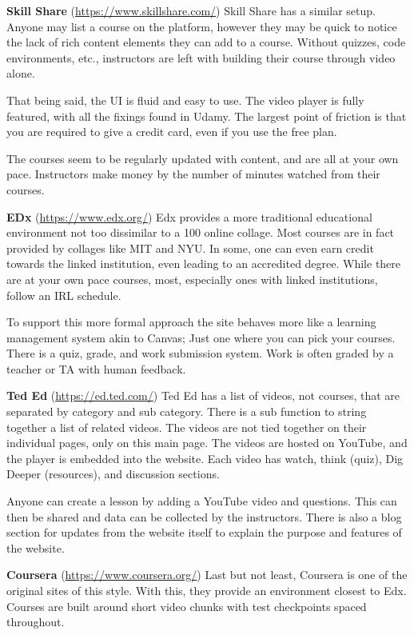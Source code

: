 \documentclass{article}
\begin{document}
\textbf{Skill Share} (\url{https://www.skillshare.com/})
Skill Share has a similar setup. Anyone may list a course on the platform,
however they may be quick to notice the lack of rich content elements they can
add to a course. Without quizzes, code environments, etc., instructors are
left with building their course through video alone.

That being said, the UI is fluid and easy to use. The video player is fully
featured, with all the fixings found in Udamy. The largest point of friction is
that you are required to give a credit card, even if you use the free
plan.

The courses seem to be regularly updated with content, and are all at your own
pace. Instructors make money by the number of minutes watched from their
courses.

\textbf{EDx} (\url{https://www.edx.org/})
Edx provides a more traditional educational environment not too dissimilar to a 100%
online collage. Most courses are in fact provided by collages like MIT and NYU.
In some, one can even earn credit towards the linked institution, even leading
to an accredited degree. While there are at your own pace courses,
most, especially ones with linked institutions, follow an IRL schedule.

To support this more formal approach the site behaves more like a learning
management system akin to Canvas; Just one where you can pick your courses.
There is a quiz, grade, and work submission system. Work is often graded by a
teacher or TA with human feedback.

\textbf{Ted Ed} (\url{https://ed.ted.com/})
Ted Ed has a list of videos, not courses, that are separated by category and sub category. There is a sub function to string together a list of related videos. The videos are not tied together on their individual pages, only on this main page. The videos are hosted on YouTube, and the player is embedded into the website. Each video has watch, think (quiz), Dig Deeper (resources), and discussion sections.

Anyone can create a lesson by adding a YouTube video and questions. This can then be shared and data can be collected by the instructors. There is also a blog section for updates from the website itself to explain the purpose and features of the website.

\textbf{Coursera} (\url{https://www.coursera.org/})
Last but not least, Coursera is one of the original sites of this style. With
this, they provide an environment closest to Edx. Courses are built around short
video chunks with test checkpoints spaced throughout.
\end{document}

